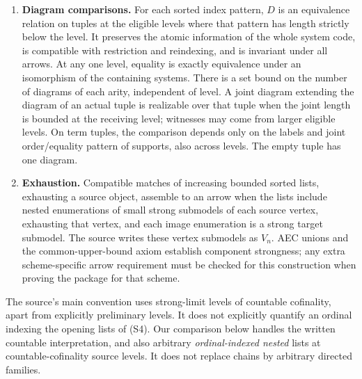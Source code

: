 \begin{definition}
\begin{enumerate}[label=\textup{(S\arabic*)},leftmargin=*]
$\mu$-object is contained in a $\nu$-object included by an arrow,
retaining the fixed distinguished data.
\item \textbf{Diagram comparisons.}
For each sorted index pattern, $D$ is an equivalence relation on tuples
at the eligible levels where that pattern has length strictly below the
level. It preserves the atomic information of the whole system code,
is compatible with restriction and reindexing, and is invariant under
all arrows. At any one level, equality is exactly equivalence under an
isomorphism of the containing systems. There is a set bound on the
number of diagrams of each arity, independent of level. A joint diagram
extending the diagram of an actual tuple is realizable over that tuple
when the joint length is bounded at the receiving level; witnesses may
come from larger eligible levels. On term tuples, the comparison depends
only on the labels and joint order/equality pattern of supports, also
across levels. The empty tuple has one diagram.
\item \textbf{Exhaustion.}
Compatible matches of increasing bounded sorted lists, exhausting a
source object, assemble to an arrow when the lists include nested
enumerations of small strong submodels of each source vertex, exhausting
that vertex, and each image enumeration is a strong target submodel.
The source writes these vertex submodels as $V_n$.
AEC unions and the common-upper-bound axiom establish component
strongness; any extra scheme-specific arrow requirement must be checked
for this construction when proving the package for that scheme.
\end{enumerate}
The source's main convention uses strong-limit levels of countable
cofinality, apart from explicitly preliminary levels. It does not
explicitly quantify an ordinal indexing the opening lists of (S4).
Our comparison below handles the written countable interpretation, and
also arbitrary \emph{ordinal-indexed nested} lists at countable-cofinality
source levels. It does not replace chains by arbitrary directed families.
\end{definition}

